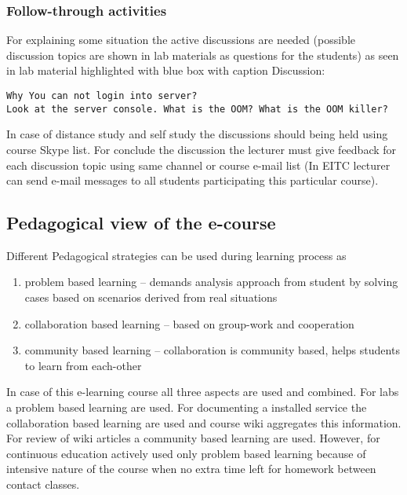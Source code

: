 \subsubsection{Follow-through activities}
For explaining some situation the active discussions are needed (possible discussion topics are shown in lab materials as questions for the students) as seen in lab material highlighted with blue box with caption Discussion:
\begin{Verbatim}[frame=single,
label=Discussion,framesep=2mm,rulecolor=\color{blue},commandchars=\\\{\}]
Why You can not login into server?
Look at the server console. What is the OOM? What is the OOM killer?
\end{Verbatim}
In case of distance study and self study the discussions should being held using course Skype list. For conclude the discussion the lecturer must give feedback for each discussion topic using same channel or course e-mail list (In \gls{EITC} lecturer can send e-mail messages to all students participating this particular course).



\subsection{Pedagogical view of the e-course}
Different Pedagogical strategies can be used during learning process as \citep{OppeArenduskeskus2010}
\begin{enumerate}
\item problem based learning -- demands analysis approach from student by solving cases based on scenarios derived from real situations
\item collaboration based learning -- based on group-work and cooperation
\item community based learning -- collaboration is community based, helps students to learn from each-other
\end{enumerate}

In case of this e-learning course all three aspects are used and combined.
For labs a problem based learning are used. For documenting a installed service the collaboration based learning are used and course wiki aggregates this information. For review of wiki articles a community based learning are used. However, for continuous education actively used only problem based learning because of intensive nature of the course when no extra time left for homework between contact classes.

